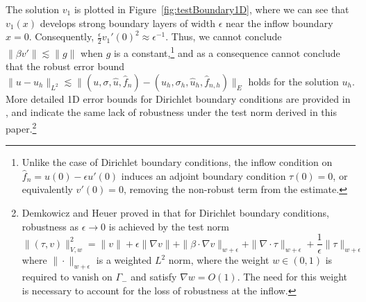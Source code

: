 \documentclass[11pt,onecolumn]{scrartcl}
\newcommand{\grad}{\nabla}
\renewcommand{\div}{\grad \cdot}
\begin{document}
The solution $v_1$ is plotted in Figure~\ref{fig:testBoundary1D}, where we can see that $v_1(x)$ develops strong boundary layers of width $\epsilon$ near the inflow boundary $x=0$. Consequently, $\frac{\epsilon}{2} v_1'(0)^2 \approx \epsilon^{-1}$. Thus, we cannot conclude $\|\beta v'\| \lesssim \|g\|$ when $g$ is a constant,\footnote{Unlike the case of Dirichlet boundary conditions, the inflow condition on $ \widehat{f}_n = u(0)-\epsilon u'(0)$ induces an adjoint boundary condition $\tau(0)=0$, or equivalently $v'(0) = 0$, removing the non-robust term from the estimate.} and as a consequence cannot conclude that the robust error bound $\|u-u_h\|_{L^2} \lesssim \|(u,\sigma,\widehat{u},\widehat{f}_n)-(u_h,\sigma_h,\widehat{u}_h,\widehat{f}_{n,h})\|_E$ holds for the solution $u_h$.  More detailed 1D error bounds for Dirichlet boundary conditions are provided in \cite{DPG3}, and indicate the same lack of robustness under the test norm derived in this paper.\footnote{Demkowicz and Heuer proved in \cite{DPGrobustness} that for Dirichlet boundary conditions, robustness as $\epsilon \rightarrow 0$ is achieved by the test norm
\[
\|\left(\tau, v\right)\|_{V,w}^2 = \|v\| + \epsilon \|\grad v\| + \|\beta \cdot \grad v\|_{w+\epsilon} + \| \div \tau\|_{w+\epsilon} + \frac{1}{\epsilon}\|\tau\|_{w+\epsilon}
\]
where $\|\cdot \|_{w+\epsilon}$ is a weighted $L^2$ norm, where the weight $w \in (0,1)$ is required to vanish on $\Gamma_-$ and satisfy $\grad w = O(1)$. The need for this weight is necessary to account for the loss of robustness at the inflow.} 
\end{document}

